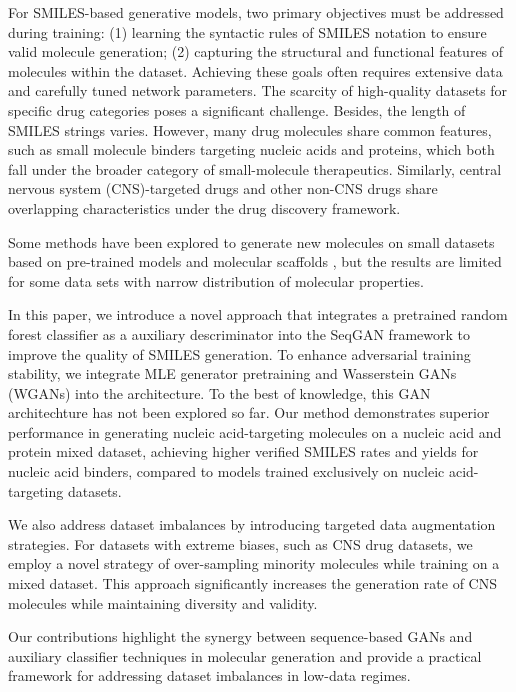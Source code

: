 \documentclass[10pt, twocolumn]{article}
\begin{document}
For SMILES-based generative models, two primary objectives must be addressed during training: (1) learning the syntactic rules of SMILES notation to ensure valid molecule generation; (2) capturing the structural and functional features of molecules within the dataset. Achieving these goals often requires extensive data and carefully tuned network parameters\cite{Lucic2017,Elton2019}. The scarcity of high-quality datasets for specific drug categories poses a significant challenge. Besides, the length of SMILES strings varies. However, many drug molecules share common features, such as small molecule binders targeting nucleic acids and proteins, which both fall under the broader category of small-molecule therapeutics. Similarly, central nervous system (CNS)-targeted drugs and other non-CNS drugs share overlapping characteristics under the drug discovery framework.

Some methods have been explored to generate new molecules on small datasets based on pre-trained models and molecular scaffolds \cite{Moret2020,Fang2023}, but the results are limited for some data sets with narrow distribution of molecular properties.

In this paper, we introduce a novel approach that integrates a pretrained random forest classifier as a auxiliary descriminator into the SeqGAN framework to improve the quality of SMILES generation. To enhance adversarial training stability, we integrate MLE generator pretraining\cite{Yu2016,Guimaraes2017,Putin2018a} and Wasserstein GANs (WGANs)\cite{Arjovsky2017,Guimaraes2017} into the architecture. To the best of knowledge, this GAN architechture has not been explored so far. Our method demonstrates superior performance in generating nucleic acid-targeting molecules on a nucleic acid and protein mixed dataset, achieving higher verified SMILES rates and yields for nucleic acid binders, compared to models trained exclusively on nucleic acid-targeting datasets.

We also address dataset imbalances by introducing targeted data augmentation strategies. For datasets with extreme biases, such as CNS drug datasets, we employ a novel strategy of over-sampling minority molecules while training on a mixed dataset. This approach significantly increases the generation rate of CNS molecules while maintaining diversity and validity.

Our contributions highlight the synergy between sequence-based GANs and auxiliary classifier techniques in molecular generation and provide a practical framework for addressing dataset imbalances in low-data regimes.
\end{document}

